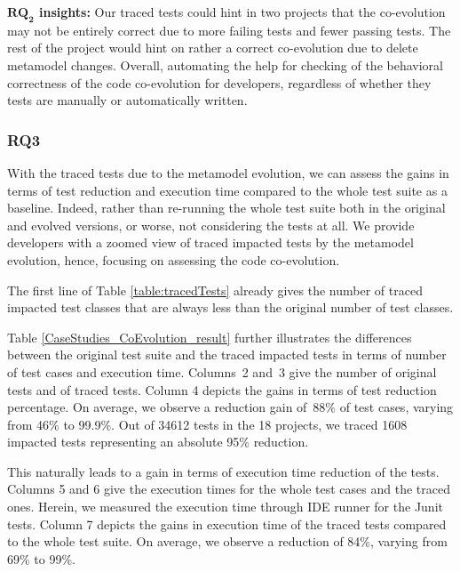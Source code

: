 \begin{tcolorbox}[boxsep=-2pt]
\textbf{$\boldsymbol{RQ_2}$ insights:}
Our traced tests could hint in two projects that the co-evolution may not be entirely correct due to more failing tests and fewer passing tests. The rest of the project would hint on rather a correct co-evolution due to delete metamodel changes. Overall, automating the help for checking of the behavioral correctness of the code co-evolution for developers, regardless of whether they tests are manually or automatically written.  
\end{tcolorbox}



\subsubsection{RQ3}
With the traced tests due to the metamodel evolution, we can assess the gains in terms of test reduction and execution time compared to the whole test suite as a baseline. 
Indeed, rather than re-running the whole test suite both in the original and evolved versions, or worse, not considering the tests at all. We provide developers with a zoomed view of traced impacted tests by the metamodel evolution, hence, focusing on assessing the code co-evolution.  

The first line of Table \ref{table:tracedTests} already gives the number of traced impacted test classes that are always less than the original number of test classes. 

Table \ref{CaseStudies_CoEvolution_result} further illustrates the differences between the original test suite and the traced impacted tests in terms of number of test cases and execution time. Columns~2 and~3 give the number of original tests and of traced tests.
%
Column 4 depicts the gains in terms of test reduction percentage. On average, we observe a reduction gain of~88\% of test cases, varying from 46\% to 99.9\%. Out of 34612 tests in the 18 projects, we traced 1608 impacted tests representing an absolute 95\% reduction.

This naturally leads to a gain in terms of execution time reduction of the tests. 
Columns 5 and 6 give the execution times for the whole test cases and the traced ones. Herein, we measured the execution time through IDE runner for the Junit tests.
Column 7 depicts the gains in execution time of the traced tests compared to the whole test suite. On average, we observe a reduction of 84\%, varying from 69\% to 99\%. 


